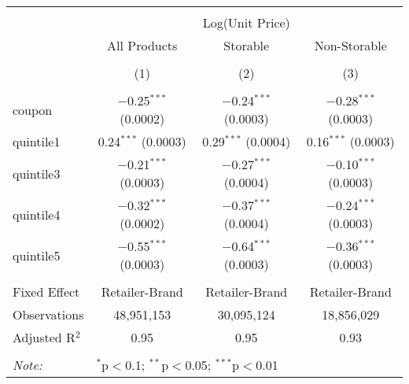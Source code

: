 
\begin{table}[!htbp] \centering 
  \caption{} 
  \label{tab:overallSavings} 
\begin{tabular}{@{\extracolsep{5pt}}lccc} 
\\[-1.8ex]\hline 
\hline \\[-1.8ex] 
 & \multicolumn{3}{c}{Log(Unit Price)} \\ 
\cline{2-4} 
 & All Products & Storable & Non-Storable \\ 
\\[-1.8ex] & (1) & (2) & (3)\\ 
\hline \\[-1.8ex] 
 coupon & $-$0.25$^{***}$ (0.0002) & $-$0.24$^{***}$ (0.0003) & $-$0.28$^{***}$ (0.0003) \\ 
  quintile1 & 0.24$^{***}$ (0.0003) & 0.29$^{***}$ (0.0004) & 0.16$^{***}$ (0.0003) \\ 
  quintile3 & $-$0.21$^{***}$ (0.0003) & $-$0.27$^{***}$ (0.0004) & $-$0.10$^{***}$ (0.0003) \\ 
  quintile4 & $-$0.32$^{***}$ (0.0002) & $-$0.37$^{***}$ (0.0004) & $-$0.24$^{***}$ (0.0003) \\ 
  quintile5 & $-$0.55$^{***}$ (0.0003) & $-$0.64$^{***}$ (0.0003) & $-$0.36$^{***}$ (0.0003) \\ 
 \hline \\[-1.8ex] 
Fixed Effect & Retailer-Brand & Retailer-Brand & Retailer-Brand \\ 
Observations & 48,951,153 & 30,095,124 & 18,856,029 \\ 
Adjusted R$^{2}$ & 0.95 & 0.95 & 0.93 \\ 
\hline 
\hline \\[-1.8ex] 
\textit{Note:}  & \multicolumn{3}{l}{$^{*}$p$<$0.1; $^{**}$p$<$0.05; $^{***}$p$<$0.01} \\ 
\end{tabular} 
\end{table} 
